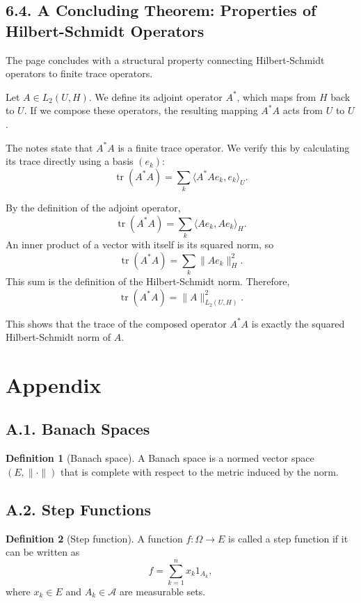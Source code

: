 \documentclass[11pt]{article}
\theoremstyle{definition}
\newtheorem{definition}{Definition}
\theoremstyle{remark}
\begin{document}
\subsection*{6.4. A Concluding Theorem: Properties of Hilbert-Schmidt Operators}
The page concludes with a structural property connecting Hilbert-Schmidt operators to finite trace operators.

Let \(A\in L_2(U,H)\). We define its adjoint operator \(A^*\), which maps from \(H\) back to \(U\). If we compose these operators, the resulting mapping \(A^*A\) acts from \(U\) to \(U\).

The notes state that \(A^*A\) is a finite trace operator. We verify this by calculating its trace directly using a basis \((e_k)\):
\[
\operatorname{tr}(A^*A)=\sum_k \langle A^*Ae_k,e_k\rangle_U.
\]

By the definition of the adjoint operator,
\[
\operatorname{tr}(A^*A)=\sum_k \langle Ae_k,Ae_k\rangle_H.
\]
An inner product of a vector with itself is its squared norm, so
\[
\operatorname{tr}(A^*A)=\sum_k \|Ae_k\|_H^2.
\]
This sum is the definition of the Hilbert-Schmidt norm. Therefore,
\[
\operatorname{tr}(A^*A)=\|A\|_{L_2(U,H)}^2.
\]

This shows that the trace of the composed operator \(A^*A\) is exactly the squared Hilbert-Schmidt norm of \(A\).

\section*{Appendix}
\subsection*{A.1. Banach Spaces}
\begin{definition}[Banach space]
A Banach space is a normed vector space \((E,\|\cdot\|)\) that is complete with respect to the metric induced by the norm.
\end{definition}

\subsection*{A.2. Step Functions}
\begin{definition}[Step function]
A function \(f:\Omega\to E\) is called a step function if it can be written as
\[
f=\sum_{k=1}^{n}x_k1_{A_k},
\]
where \(x_k\in E\) and \(A_k\in\mathcal A\) are measurable sets.
\end{definition}
\end{document}
